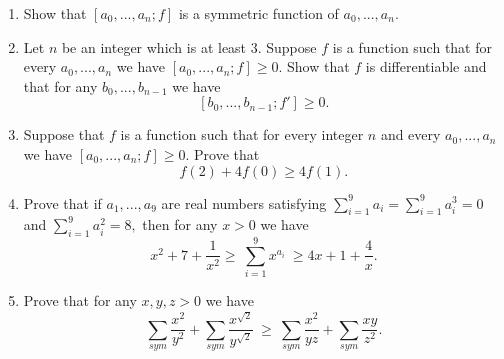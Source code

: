 \begin{enumerate}
\item Show that $[a_0, ..., a_n;f]$ is a symmetric function of $a_0, ..., a_n$.

\item Let $n$ be an integer which is at least $3$. Suppose $f$ is a function such that for every $a_0, ..., a_n$ we have $[a_0, ..., a_n; f] \ge 0$. Show that $f$ is differentiable and that for any $b_0, ..., b_{n-1}$ we have
\[
[b_0, ..., b_{n-1}; f'] \ge 0.
\]

\item Suppose that $f$ is a function such that for every integer $n$ and every $a_0, ..., a_n$ we have $[a_0, ..., a_n;f] \ge 0$. Prove that
\[
f(2) + 4f(0) \ge 4f(1).
\]

\item Prove that if $a_1, ..., a_9$ are real numbers satisfying $\sum_{i=1}^9 a_i = \sum_{i=1}^9 a_i^3 = 0$ and $\sum_{i=1}^9 a_i^2 = 8,$ then for any $x > 0$ we have
\[
x^2 + 7 + \frac{1}{x^2} \ge\ \sum_{i=1}^9 x^{a_i}\ \ge 4x + 1 + \frac{4}{x}.
\]

\item Prove that for any $x,y,z > 0$ we have
\[
\sum_{sym} \frac{x^2}{y^2} + \sum_{sym} \frac{x^{\sqrt{2}}}{y^{\sqrt{2}}}\ \ge\ \sum_{sym} \frac{x^2}{yz} + \sum_{sym} \frac{xy}{z^2}.
\]
\end{enumerate}


